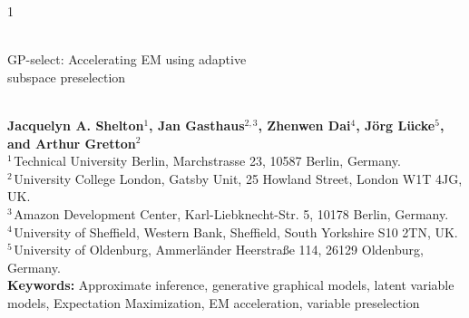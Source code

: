 \documentclass[12pt]{article}
\begin{document}
\hspace{13.9cm}1

\ \vspace{20mm}\\ 

{\LARGE GP-select: Accelerating EM using adaptive \\subspace preselection}

\ \\
{\bf \large Jacquelyn A. Shelton$^{\displaystyle 1}$, Jan Gasthaus$^{\displaystyle 2,3}$, Zhenwen Dai$^{\displaystyle 4}$, J\"org L\"{u}cke$^{\displaystyle 5}$, and Arthur Gretton$^{\displaystyle 2}$}\\
{$^{\displaystyle 1 \,}$Technical University Berlin, Marchstrasse 23, 10587 Berlin, Germany.}\\
{$^{\displaystyle 2 \,}$University College London, Gatsby Unit, 25 Howland Street, London W1T 4JG, UK.}\\
{$^{\displaystyle 3 \,}$Amazon Development Center, Karl-Liebknecht-Str. 5, 10178 Berlin, Germany.}\\
{$^{\displaystyle 4 \,}$University of Sheffield, Western Bank, Sheffield, South Yorkshire S10 2TN, UK.}\\
{$^{\displaystyle 5 \,}$University of Oldenburg, Ammerländer Heerstraße 114, 26129 Oldenburg, Germany.}\\
%
{\bf Keywords:} Approximate inference, generative graphical models, latent variable models, Expectation Maximization, EM acceleration, variable preselection
\end{document}

